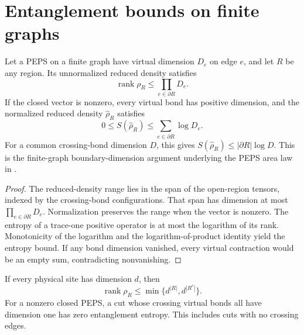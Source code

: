 \section{Entanglement bounds on finite graphs}%
\label{sec:peps_region_entanglement_bound}

\begin{lemma}%
    \label{thm:peps_region_boundary_entanglement_bound}
    \leanok
    Let a PEPS on a finite graph have virtual dimension $D_e$ on
    edge $e$, and let $R$ be any region. Its unnormalized reduced
    density satisfies
    \[
        \operatorname{rank}\rho_R\leq
        \prod_{e\in\partial R}D_e.
    \]
    If the closed vector is nonzero, every virtual bond has
    positive dimension, and the normalized reduced density
    $\widehat\rho_R$ satisfies
    \[
        0\leq S(\widehat\rho_R)
        \leq\sum_{e\in\partial R}\log D_e.
    \]
    For a common crossing-bond dimension $D$, this gives
    $S(\widehat\rho_R)\leq|\partial R|\log D$.
    This is the finite-graph boundary-dimension argument underlying
    the PEPS area law in \cite[Section~II.A.3]{Cirac2021Matrix}.
\end{lemma}

\begin{proof}\leanok
    The reduced-density range lies in the span of the open-region
    tensors, indexed by the crossing-bond configurations. That
    span has dimension at most $\prod_{e\in\partial R}D_e$.
    Normalization preserves the range when the vector is nonzero.
    The entropy of a trace-one positive operator is at most the
    logarithm of its rank. Monotonicity of the logarithm and
    the logarithm-of-product identity yield the entropy bound.
    If any bond dimension vanished, every virtual contraction
    would be an empty sum, contradicting nonvanishing.
\end{proof}

\begin{lemma}%
    \label{thm:peps_region_physical_entanglement_bound}
    \leanok
    If every physical site has dimension $d$, then
    \[
        \operatorname{rank}\rho_R\leq
        \min\{d^{|R|},d^{|R^c|}\}.
    \]
    For a nonzero closed PEPS, a cut whose crossing virtual bonds
    all have dimension one has zero entanglement entropy. This
    includes cuts with no crossing edges.
\end{lemma}

